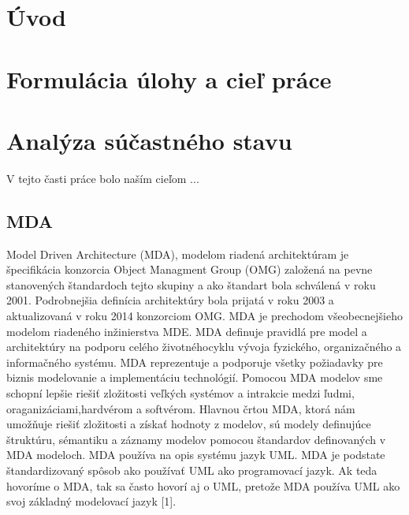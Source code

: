 \documentclass[a4paper]{feidippp}
\begin{document}




\titulnastrana

\newpage


\tableofcontents



\newpage

\setcounter{page}{1}

\section{Úvod}



\section{	Formulácia úlohy a cieľ práce}


\section{	Analýza súčastného stavu}

 V tejto časti práce bolo naším cieľom  ...

\subsection{MDA}


Model Driven Architecture (MDA), modelom riadená architektúram je špecifikácia konzorcia Object Managment Group (OMG) založená na pevne stanovených štandardoch tejto skupiny a ako štandart bola schválená v roku 2001. Podrobnejšia definícia architektúry bola prijatá v roku 2003 a aktualizovaná v roku 2014 konzorciom OMG. MDA je prechodom všeobecnejšieho modelom riadeného inžinierstva  MDE. MDA definuje pravidlá pre model a architektúry na podporu celého životnéhocyklu vývoja fyzického, organizačného a informačného systému. MDA reprezentuje a podporuje všetky požiadavky pre biznis modelovanie a implementáciu technológií. Pomocou MDA modelov sme schopní lepšie riešiť zložitosti veľkých systémov a intrakcie medzi ľudmi, oraganizáciami,hardvérom a softvérom.
Hlavnou črtou MDA, ktorá nám umožňuje riešiť zložitosti a získať hodnoty z modelov, sú modely  definujúce štruktúru, sémantiku a záznamy modelov pomocou štandardov definovaných v MDA modeloch.
MDA používa na opis systému jazyk UML. MDA je podstate štandardizovaný spôsob ako používať UML ako programovací jazyk. Ak teda hovoríme o MDA, tak sa často hovorí aj o UML, pretože MDA používa UML ako svoj základný modelovací jazyk [1].
\end{document}
